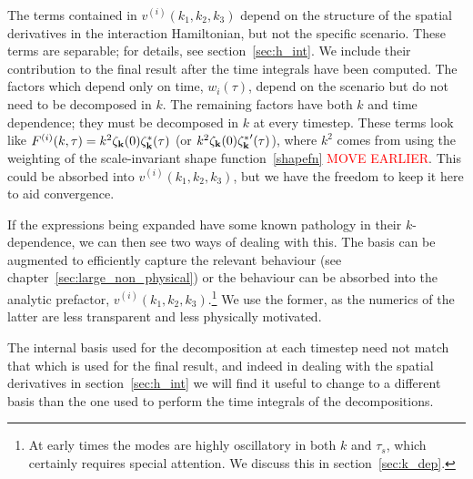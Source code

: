 The terms contained in $v^{(i)}(k_1, k_2,k_3)$ depend on the structure of the spatial derivatives in the interaction Hamiltonian,
but not the specific scenario. These terms are separable; for details, see section~\ref{sec:h_int}.
We include their contribution to the final result after the time integrals have been computed.
The factors which depend only on time, $w_i(\tau)$, depend on the scenario
but do not need to be decomposed in $k$.
The remaining factors have both $k$ and time dependence;
they must be decomposed in $k$ at every timestep.
These terms look like $F^{(i)}(k, \tau) = k^{2} \zeta_{\bf k}(0)\zeta_{\bf k}^*(\tau)$
(or $k ^{2} \zeta_{\bf k}(0){\zeta_{\bf k}^*}'(\tau)$),
where $k^2$ comes from using the weighting of the scale-invariant shape function~\eqref{shapefn}
\textcolor{red}{MOVE EARLIER}.
This could be absorbed into $v^{(i)}(k_1, k_2,k_3)$, but we have the freedom to keep it here to aid convergence.

If the expressions being expanded have some known pathology in their $k$-dependence,
we can then see two ways of dealing with this.
The basis can be augmented to efficiently capture the relevant behaviour
(see chapter~\ref{sec:large_non_physical})
or the behaviour can be absorbed into the analytic prefactor, $v^{(i)}(k_1, k_2,k_3)$.\footnote{At early times the modes are highly oscillatory in both $k$ and $\tau_s$, which certainly requires special attention.
We discuss this in section~\ref{sec:k_dep}.}
We use the former, as the numerics of the latter are less transparent
and less physically motivated.

The internal basis used for the decomposition at each timestep need not match that
which is used for the final result,
and indeed in dealing with the spatial derivatives in section~\ref{sec:h_int}
we will find it useful to change to a different basis than the one used to perform the
time integrals of the decompositions.

